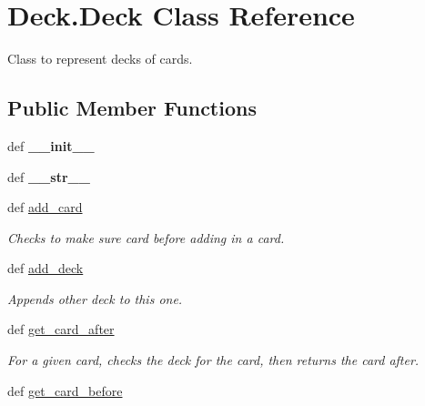 \hypertarget{classDeck_1_1Deck}{\section{Deck.\-Deck Class Reference}
\label{classDeck_1_1Deck}
}


Class to represent decks of cards.  


\subsection*{Public Member Functions}
\begin{DoxyCompactItemize}
\item 
\hypertarget{classDeck_1_1Deck_a6a390d22da44a455acfc5cdfbe7d815a}{def {\bfseries \-\_\-\-\_\-init\-\_\-\-\_\-}}\label{classDeck_1_1Deck_a6a390d22da44a455acfc5cdfbe7d815a}

\item 
\hypertarget{classDeck_1_1Deck_a345811800e6433aa7f9dabe9ae08abe4}{def {\bfseries \-\_\-\-\_\-str\-\_\-\-\_\-}}\label{classDeck_1_1Deck_a345811800e6433aa7f9dabe9ae08abe4}

\item 
def \hyperlink{classDeck_1_1Deck_a3c6d86cee4951b877e2e45702e34a4e8}{add\-\_\-card}
\begin{DoxyCompactList}\small\item\em Checks to make sure card before adding in a card. \end{DoxyCompactList}\item 
\hypertarget{classDeck_1_1Deck_a5f11cd1bd5a10e1234d895e6b198e0a8}{def \hyperlink{classDeck_1_1Deck_a5f11cd1bd5a10e1234d895e6b198e0a8}{add\-\_\-deck}}\label{classDeck_1_1Deck_a5f11cd1bd5a10e1234d895e6b198e0a8}

\begin{DoxyCompactList}\small\item\em Appends other deck to this one. \end{DoxyCompactList}\item 
\hypertarget{classDeck_1_1Deck_a9e4f601cbc701028012933d6091cb921}{def \hyperlink{classDeck_1_1Deck_a9e4f601cbc701028012933d6091cb921}{get\-\_\-card\-\_\-after}}\label{classDeck_1_1Deck_a9e4f601cbc701028012933d6091cb921}

\begin{DoxyCompactList}\small\item\em For a given card, checks the deck for the card, then returns the card after. \end{DoxyCompactList}\item 
\hypertarget{classDeck_1_1Deck_aae59147619d0d796121eba2eb0d453ef}{def \hyperlink{classDeck_1_1Deck_aae59147619d0d796121eba2eb0d453ef}{get\-\_\-card\-\_\-before}}\label{classDeck_1_1Deck_aae59147619d0d796121eba2eb0d453ef}


\end{DoxyCompactItemize}
